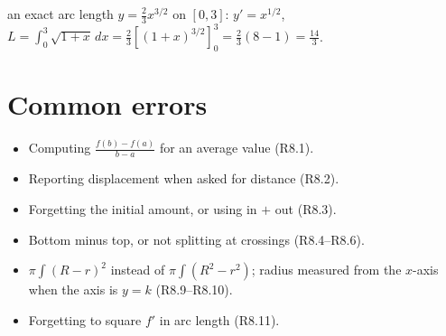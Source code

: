 \documentclass{apcalc}
\begin{document}
\begin{example}{an exact arc length}
$y=\frac23x^{3/2}$ on $[0,3]$: $y'=x^{1/2}$, $L=\int_0^3\sqrt{1+x}\,dx=\frac23\left[(1+x)^{3/2}\right]_0^3=\frac23(8-1)=\frac{14}{3}$.
\end{example}

\section{Common errors}
\begin{itemize}
\item Computing $\frac{f(b)-f(a)}{b-a}$ for an average value (R8.1).
\item Reporting displacement when asked for distance (R8.2).
\item Forgetting the initial amount, or using in $+$ out (R8.3).
\item Bottom minus top, or not splitting at crossings (R8.4--R8.6).
\item $\pi\int(R-r)^2$ instead of $\pi\int(R^2-r^2)$; radius measured from the $x$-axis when the axis is $y=k$ (R8.9--R8.10).
\item Forgetting to square $f'$ in arc length (R8.11).
\end{itemize}
\end{document}
